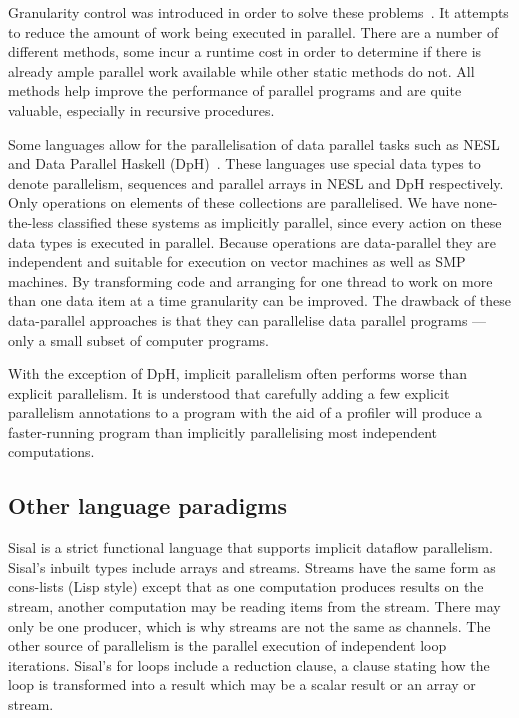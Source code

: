 Granularity control was introduced in order to solve these
problems~\citep{lopez96:distance_granularity,shen_98_granularity-control}.
It attempts to reduce the amount of work being executed in parallel.
There are a number of different methods, some incur a
runtime cost in order to determine if there is already ample parallel
work available while other static methods do not.
All methods help improve the performance of parallel programs and are
quite valuable, especially in recursive procedures.

Some languages allow for the parallelisation of data parallel
tasks such as NESL~\citep{blelloch:95:nesl} and Data Parallel
Haskell (DpH)~\citep{dph:2007:status_report,dph:2008:harnessing_the_multicores}.
These languages use special data types to denote parallelism,
sequences and parallel arrays in NESL and DpH respectively.
Only operations on elements of these collections are parallelised.
We have none-the-less classified these systems as implicitly parallel,
since every action on these data types is executed in parallel.
Because operations are data-parallel they are independent and suitable
for execution on vector machines as well as SMP machines.
By transforming code and arranging for one thread to work on more than
one data item at a time granularity can be improved.
The drawback of these data-parallel approaches is that they can
parallelise data parallel programs
--- only a small subset of computer programs.

With the exception of DpH, implicit parallelism often performs worse
than explicit parallelism.
It is understood that carefully adding a few explicit parallelism annotations
to a program with the aid of a profiler will produce a faster-running
program than implicitly parallelising most independent computations.

\subsection{Other language paradigms}
\label{sec:intro_par_other}

Sisal \citep{feo:1990:sisal-report} is a strict functional language that
supports implicit dataflow parallelism.
Sisal's inbuilt types include arrays and streams.
Streams have the same form as cons-lists (Lisp style) except that as one
computation produces results on the stream, another computation may be
reading items from the stream.
There may only be one producer, which is why streams are not the same as
channels.
The other source of parallelism is the parallel execution of independent
loop iterations.
Sisal's for loops include a reduction clause,
a clause stating how the loop is transformed into a result which may be a
scalar result or an array or stream.


